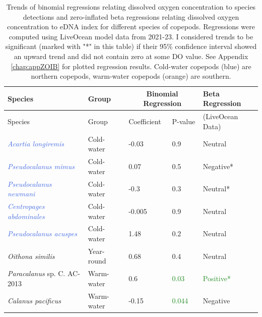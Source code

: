 \documentclass[12pt,twoside]{reedthesis}
\begin{document}
	\begin{table}[!h] 
		\begin{tabular}{l | l | l l | l}
			\toprule
			Species & Group & \multicolumn{2}{|c|}{Binomial Regression} & Beta Regression \tabularnewline
			\midrule
			Species &  Group & Coefficient & P-value & (LiveOcean Data)  \\ 
			\midrule 
			\textcolor{RoyalBlue}{\textit{Acartia longiremis}}	& Cold-water & -0.03 & 0.9 & Neutral  \\
			\textcolor{RoyalBlue}{\textit{Pseudocalanus mimus}} & Cold-water & 0.07  & 0.5 & \textcolor{BrickRed}{Negative*}  \\
			\textcolor{RoyalBlue}{\textit{Pseudocalanus newmani}}	& Cold-water & -0.3  & 0.3 &  Neutral* \\
			\textcolor{RoyalBlue}{\textit{Centropages abdominales}} & Cold-water & -0.005 & 0.9 & Neutral   \\
			\textcolor{RoyalBlue}{\textit{Pseudocalanus acuspes}}  & Cold-water & 1.48  & 0.2 & Neutral  \\
			\textit{Oithona similis} & Year-round & 0.68  & 0.4 & Neutral \\
			\textcolor{RedOrange}{\textit{Paracalanus} sp. C. AC-2013} & Warm-water & 0.6  & \textcolor{ForestGreen}{0.03} & \textcolor{ForestGreen}{Positive*}  \\
			\textcolor{RedOrange}{\textit{Calanus pacificus}}	& Warm-water & -0.15  & \textcolor{ForestGreen}{0.044} & \textcolor{BrickRed}{Negative}  \\
			\bottomrule 
		\end{tabular}
		\label{Resultstab}
		\caption[Regression results]{Trends of binomial regressions relating dissolved oxygen concentration to species detections and zero-inflated beta regressions relating dissolved oxygen concentration to eDNA index for different species of copepods. Regressions were computed using LiveOcean model data from 2021-23. I considered trends to be significant (marked with "*" in this table) if their 95\% confidence interval showed an upward trend and did not contain zero at some DO value. See Appendix \ref{chap:appZOIB} for plotted regression results. Cold-water copepods (blue) are northern copepods, warm-water copepods (orange) are southern.}  
	\end{table}
	
\end{document}
